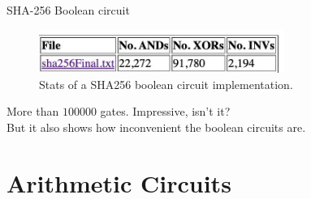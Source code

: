 \documentclass{zkdl-presentation-template}
\begin{document}
    \begin{frame}{SHA-256 Boolean circuit}
        \begin{figure}[h!]
            \centering
            \includegraphics[width=8cm]{../presentations/images/lecture_8/sha256booleancircuit.jpg}
            \caption{Stats of a SHA256 boolean circuit implementation.}
        \end{figure}
        More than $100000$ gates. Impressive, isn't it? \\
        \vspace{5pt }
        But it also shows how inconvenient the boolean circuits are. 
    \end{frame}

    \section{Arithmetic Circuits}
\end{document}
